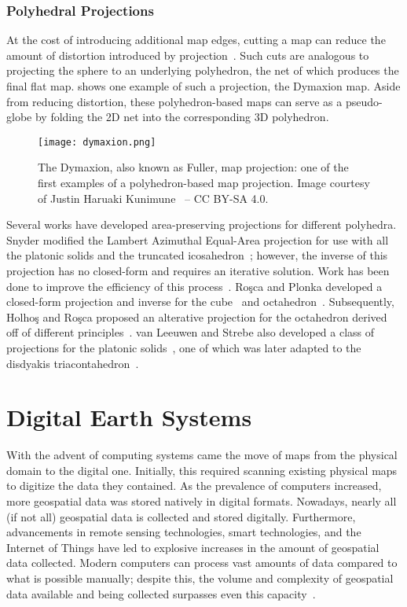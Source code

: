 \subsubsection{Polyhedral Projections} \label{chap:2:polyProj}
At the cost of introducing additional map edges, cutting a map can reduce the amount of distortion introduced by projection~\cite{soliman2018optimal}.
Such cuts are analogous to projecting the sphere to an underlying polyhedron, the net of which produces the final flat map.
 shows one example of such a projection, the Dymaxion map.
Aside from reducing distortion, these polyhedron-based maps can serve as a pseudo-globe by folding the 2D net into the corresponding 3D polyhedron.


\begin{figure}[ht!]
	\centering
	\texttt{[image: dymaxion.png]}
	\caption[The Dymaxion (or Fuller) map projection]{
		The Dymaxion, also known as Fuller, map projection: one of the first examples of a polyhedron-based map projection.
		Image courtesy of Justin Haruaki Kunimune~\cite{dymaxion} -- CC BY-SA 4.0.
	}
	\label{fig:poly-projection}
\end{figure}


Several works have developed area-preserving projections for different polyhedra.
Snyder modified the Lambert Azimuthal Equal-Area projection for use with all the platonic solids and the truncated icosahedron~\cite{snyder1992equal}; however, the inverse of this projection has no closed-form and requires an iterative solution.
Work has been done to improve the efficiency of this process~\cite{harrison2011optimization}.
Ro{\c{s}}ca and Plonka developed a closed-form projection and inverse for the cube~\cite{rocsca2011uniform} and octahedron~\cite{rocsca2012area}.
Subsequently, Holho{\c{s}} and Ro{\c{s}}ca proposed an alterative projection for the octahedron derived off of different principles~\cite{holhocs2014octahedral}.
van Leeuwen and Strebe also developed a class of projections for the platonic solids~\cite{van2006slice}, one of which was later adapted to the disdyakis triacontahedron~\cite{hall2020disdyakis}.


\section{Digital Earth Systems} \label{chap:2:DE}
With the advent of computing systems came the move of maps from the physical domain to the digital one.
Initially, this required scanning existing physical maps to digitize the data they contained.
As the prevalence of computers increased, more geospatial data was stored natively in digital formats.
Nowadays, nearly all (if not all) geospatial data is collected and stored digitally.
Furthermore, advancements in remote sensing technologies, smart technologies, and the Internet of Things have led to explosive increases in the amount of geospatial data collected.
Modern computers can process vast amounts of data compared to what is possible manually; despite this, the volume and complexity of geospatial data available and being collected surpasses even this capacity~\cite{lee2015geospatial}.


